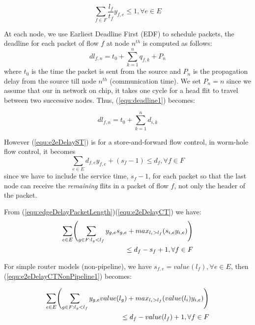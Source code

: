 \documentclass[conference, twocolumn]{IEEEtran}
\theoremstyle{definition}
\begin{document}
\begin{equation}\label{equ:utilization2}
\sum_{f \in F}\frac{l_f}{t_f}y_{f,e} \leq 1, \forall e \in E
\end{equation}

At each node, we use Earliest Deadline First (EDF) \cite{VermaJitter91} 
to schedule packets, the deadline for each packet of flow $f$ at node $n^{th}$
is computed as follows: 
\begin{equation}\label{equ:deadline1}
dl_{f,n}=t_0 + \sum_{k=1}^{n}q_{f,k}+P_n
\end{equation}
where $t_0$ is the time the packet is sent from the source and $P_n$ is the propagation
delay from the source till node $n^{th}$ (communication time). We set
$P_n=n$ since we assume that our in network on chip, it takes one cycle for a
head flit to travel between two successive nodes. Thus, (\ref{equ:deadline1}) becomes:

\begin{equation}\label{equ:deadline2}
dl_{f,n}=t_0 + \sum_{k=1}^{n}d_{i,k}
\end{equation}

However (\ref{equ:e2eDelayST}) is for a store-and-forward flow control, in
worm-hole flow control, it becomes
\begin{equation}\label{equ:e2eDelayCT}
\sum_{e \in E}d_{f,e}y_{f,e} + (s_f - 1) \leq d_f, \forall f \in F
\end{equation}
since we have to include the service time, $s_f-1$, for each
packet so that the last node can receive the {\em remaining} flits in a
packet of flow $f$, not only the header of the packet.


From (\ref{equ:edgeDelayPacketLength})(\ref{equ:e2eDelayCT}) we have:
\begin{eqnarray}\label{equ:e2eDelayCTNonPipeline1}
\sum_{e \in E} \Biggl(\sum_{g \in F:l_g <
l_f}y_{g,e}s_{g,e} +max_{l_i>l_f}(s_{i,e}y_{i,e})\Biggr)\notag \\ \leq
d_f-s_f + 1, \forall f \in F
\end{eqnarray}

For simple router models (non-pipeline), we have $s_{f,e} = value(l_f),\forall e
\in E$, then (\ref{equ:e2eDelayCTNonPipeline1}) becomes:

\begin{eqnarray}\label{equ:e2eDelayCTNonPipeline2}
\sum_{e \in E} \Biggl(\sum_{g \in F:l_g <
l_f}y_{g,e}value(l_g) +max_{l_i>l_f}(value(l_i)y_{i,e})\Biggr)\notag \\ \leq
d_f-value(l_f) + 1, \forall f \in F
\end{eqnarray}
\end{document}
